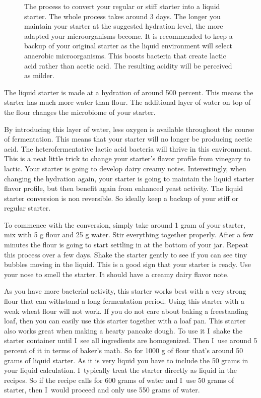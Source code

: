 \begin{figure}[!htb]
  
  \caption{The process to convert your regular or stiff starter into a liquid starter. The whole
  process takes around 3 days. The longer you maintain your starter at the
  suggested hydration level, the more adapted your microorganisms become. It is recommended
  to keep a backup of your original starter as the liquid environment will select
  anaerobic microorganisms. This boosts bacteria that create lactic acid rather
  than acetic acid. The resulting acidity will be perceived as milder.}%
  \label{fig:liquid-starter-conversion}
\end{figure}

The liquid starter is made at a hydration of around 500 percent. This means
the starter has much more water than flour. The additional layer of water on
top of the flour changes the microbiome of your starter.

By introducing this layer of water, less oxygen is available throughout the
course of fermentation. This means that your starter will no longer be
producing acetic acid. The heterofermentative lactic acid bacteria will thrive
in this environment. This is a neat little trick to change your starter's
flavor profile from vinegary to lactic. Your starter is going to develop
dairy creamy notes. Interestingly, when changing the hydration again, your starter
is going to maintain the liquid starter flavor profile, but then benefit again
from enhanced yeast activity. The liquid starter conversion is non reversible.
So ideally keep a backup of your stiff or regular starter.

To commence with the
conversion, simply take around 1 gram of your starter, mix with 5 g flour and
25 g water. Stir everything together properly. After a few minutes the flour is
going to start settling in at the bottom of your jar. Repeat this process over
a few days. Shake the starter gently to see if you can see tiny  bubbles
moving in the liquid. This is a good sign that your starter is ready. Use your
nose to smell the starter. It should have a creamy dairy flavor note.

As you have more bacterial activity, this starter works best with a very strong
flour that can withstand a long fermentation period. Using this starter with a
weak wheat flour will not work. If you do not care about baking a freestanding loaf,
then you can easily use this starter together with a loaf pan.
This starter also works great when making a hearty pancake dough. To use it
I~shake the starter container until I~see all ingredients are homogenized.  Then
I~use around 5 percent of it in terms of baker's math. So for 1000 g of flour
that's around 50 grams of liquid starter. As it is very liquid you have to
include the 50 grams in your liquid calculation. I~typically treat the starter
directly as liquid in the recipes. So if the recipe calls for 600 grams of water
and I~use 50 grams of starter, then I~would proceed and only use 550 grams of
water.

